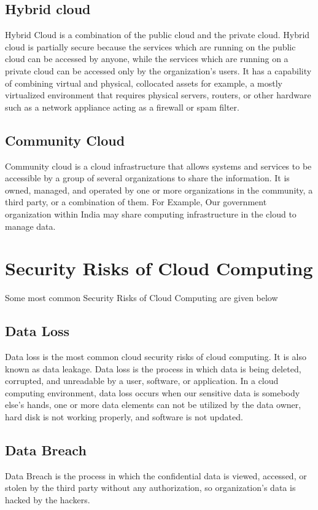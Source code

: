 \documentclass[conference]{IEEEtran}
\begin{document}
\subsection{Hybrid cloud}
Hybrid Cloud is a combination of the public cloud and the private cloud. Hybrid cloud is partially secure because the services which are running on the public cloud can be accessed by anyone, while the services which are running on a private cloud can be accessed only by the organization's users. It has a capability of combining virtual and physical, collocated assets for example, a mostly virtualized environment that requires physical servers, routers, or other hardware such as a network appliance acting as a firewall or spam filter.

\subsection{Community Cloud}
Community cloud is a cloud infrastructure that allows systems and services to be accessible by a group of several organizations to share the information. It is owned, managed, and operated by one or more organizations in the community, a third party, or a combination of them. For Example, Our government organization within India may share computing infrastructure in the cloud to manage data.

\section{Security Risks of Cloud Computing}
Some most common Security Risks of Cloud Computing are given below

\subsection{Data Loss}
Data loss is the most common cloud security risks of cloud computing. It is also known as data leakage. Data loss is the process in which data is being deleted, corrupted, and unreadable by a user, software, or application. In a cloud computing environment, data loss occurs when our sensitive data is somebody else's hands, one or more data elements can not be utilized by the data owner, hard disk is not working properly, and software is not updated.

\subsection{Data Breach}
Data Breach is the process in which the confidential data is viewed, accessed, or stolen by the third party without any authorization, so organization's data is hacked by the hackers.
\end{document}
